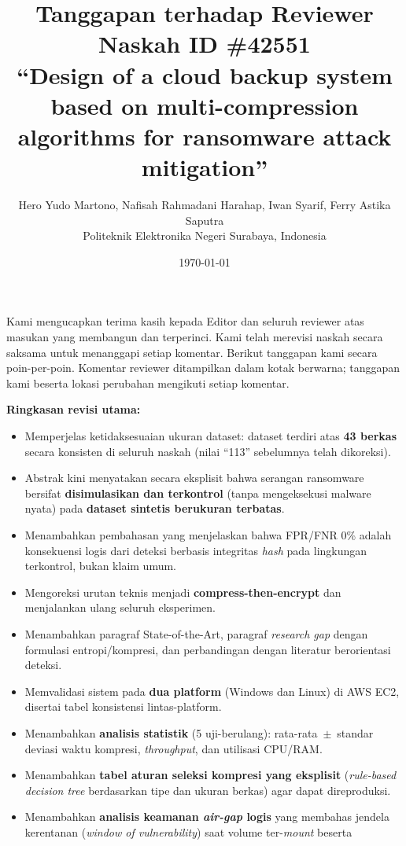 \documentclass[11pt,a4paper]{article}
\title{\textbf{Tanggapan terhadap Reviewer}\\[4pt]
\large Naskah ID \#42551\\
\normalsize ``Design of a cloud backup system based on multi-compression algorithms
for ransomware attack mitigation''}
\author{Hero Yudo Martono, Nafisah Rahmadani Harahap, Iwan Syarif, Ferry Astika Saputra\\
\small Politeknik Elektronika Negeri Surabaya, Indonesia}
\date{\today}
\begin{document}
\maketitle

\noindent Kami mengucapkan terima kasih kepada Editor dan seluruh reviewer atas masukan yang
membangun dan terperinci. Kami telah merevisi naskah secara saksama untuk menanggapi setiap
komentar. Berikut tanggapan kami secara poin-per-poin. Komentar reviewer ditampilkan dalam kotak
berwarna; tanggapan kami beserta lokasi perubahan mengikuti setiap komentar.

\medskip
\noindent\textbf{Ringkasan revisi utama:}
\begin{itemize}[leftmargin=1.4em, itemsep=1pt]
  \item Memperjelas ketidaksesuaian ukuran dataset: dataset terdiri atas \textbf{43 berkas} secara
        konsisten di seluruh naskah (nilai ``113'' sebelumnya telah dikoreksi).
  \item Abstrak kini menyatakan secara eksplisit bahwa serangan ransomware bersifat
        \textbf{disimulasikan dan terkontrol} (tanpa mengeksekusi malware nyata) pada
        \textbf{dataset sintetis berukuran terbatas}.
  \item Menambahkan pembahasan yang menjelaskan bahwa FPR/FNR 0\% adalah konsekuensi logis
        dari deteksi berbasis integritas \textit{hash} pada lingkungan terkontrol, bukan klaim umum.
  \item Mengoreksi urutan teknis menjadi \textbf{compress-then-encrypt} dan menjalankan ulang seluruh eksperimen.
  \item Menambahkan paragraf State-of-the-Art, paragraf \textit{research gap} dengan formulasi
        entropi/kompresi, dan perbandingan dengan literatur berorientasi deteksi.
  \item Memvalidasi sistem pada \textbf{dua platform} (Windows dan Linux) di AWS EC2, disertai tabel
        konsistensi lintas-platform.
  \item Menambahkan \textbf{analisis statistik} (5 uji-berulang): rata-rata~$\pm$~standar deviasi
        waktu kompresi, \textit{throughput}, dan utilisasi CPU/RAM.
  \item Menambahkan \textbf{tabel aturan seleksi kompresi yang eksplisit} (\textit{rule-based
        decision tree} berdasarkan tipe dan ukuran berkas) agar dapat direproduksi.
  \item Menambahkan \textbf{analisis keamanan \textit{air-gap} logis} yang membahas jendela
        kerentanan (\textit{window of vulnerability}) saat volume ter-\textit{mount} beserta

\end{itemize}
\end{document}
